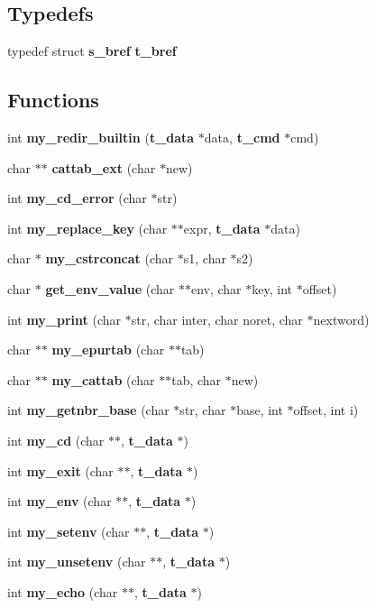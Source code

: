 \subsection*{Typedefs}
\begin{DoxyCompactItemize}
\item 
typedef struct {\bf s\-\_\-bref} {\bf t\-\_\-bref}
\end{DoxyCompactItemize}
\subsection*{Functions}
\begin{DoxyCompactItemize}
\item 
int {\bf my\-\_\-redir\-\_\-builtin} ({\bf t\-\_\-data} $\ast$data, {\bf t\-\_\-cmd} $\ast$cmd)
\item 
char $\ast$$\ast$ {\bf cattab\-\_\-ext} (char $\ast$new)
\item 
int {\bf my\-\_\-cd\-\_\-error} (char $\ast$str)
\item 
int {\bf my\-\_\-replace\-\_\-key} (char $\ast$$\ast$expr, {\bf t\-\_\-data} $\ast$data)
\item 
char $\ast$ {\bf my\-\_\-cstrconcat} (char $\ast$s1, char $\ast$s2)
\item 
char $\ast$ {\bf get\-\_\-env\-\_\-value} (char $\ast$$\ast$env, char $\ast$key, int $\ast$offset)
\item 
int {\bf my\-\_\-print} (char $\ast$str, char inter, char noret, char $\ast$nextword)
\item 
char $\ast$$\ast$ {\bf my\-\_\-epurtab} (char $\ast$$\ast$tab)
\item 
char $\ast$$\ast$ {\bf my\-\_\-cattab} (char $\ast$$\ast$tab, char $\ast$new)
\item 
int {\bf my\-\_\-getnbr\-\_\-base} (char $\ast$str, char $\ast$base, int $\ast$offset, int i)
\item 
int {\bf my\-\_\-cd} (char $\ast$$\ast$, {\bf t\-\_\-data} $\ast$)
\item 
int {\bf my\-\_\-exit} (char $\ast$$\ast$, {\bf t\-\_\-data} $\ast$)
\item 
int {\bf my\-\_\-env} (char $\ast$$\ast$, {\bf t\-\_\-data} $\ast$)
\item 
int {\bf my\-\_\-setenv} (char $\ast$$\ast$, {\bf t\-\_\-data} $\ast$)
\item 
int {\bf my\-\_\-unsetenv} (char $\ast$$\ast$, {\bf t\-\_\-data} $\ast$)
\item 
int {\bf my\-\_\-echo} (char $\ast$$\ast$, {\bf t\-\_\-data} $\ast$)
\end{DoxyCompactItemize}



